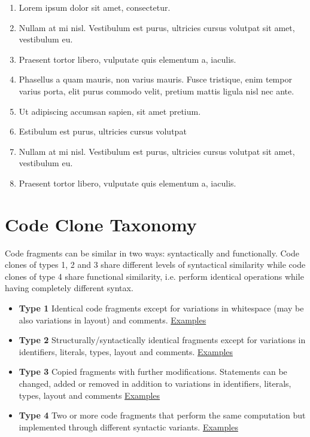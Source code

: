 \documentclass[a0,portrait]{a0poster}
\begin{document}
\begin{multicols}{2}
\begin{enumerate}
\item Lorem ipsum dolor sit amet, consectetur.
\item Nullam at mi nisl. Vestibulum est purus, ultricies cursus volutpat sit amet, vestibulum eu.
\item Praesent tortor libero, vulputate quis elementum a, iaculis.
\item Phasellus a quam mauris, non varius mauris. Fusce tristique, enim tempor varius porta, elit purus commodo velit, pretium mattis ligula nisl nec ante.
\item Ut adipiscing accumsan sapien, sit amet pretium.
\item Estibulum est purus, ultricies cursus volutpat
\item Nullam at mi nisl. Vestibulum est purus, ultricies cursus volutpat sit amet, vestibulum eu.
\item Praesent tortor libero, vulputate quis elementum a, iaculis.
\end{enumerate}


\section*{Code Clone Taxonomy}

Code fragments can be similar in two ways: syntactically and functionally. Code clones of 
types 1, 2 and 3 share different levels of syntactical similarity while code clones of type 4
share functional similarity, i.e. perform identical operations while having completely different
syntax.

\begin{itemize}
\item \textbf{Type 1} Identical code fragments except for variations in whitespace (may be also
variations in layout) and comments. 
\href{https://gist.github.com/omtcyf0/33a00a4f4406f5933526}{Examples}
\item \textbf{Type 2} Structurally/syntactically identical fragments except for variations in identifiers,
literals, types, layout and comments.
\href{https://gist.github.com/omtcyf0/1e6812f98302f374da53}{Examples}
\item \textbf{Type 3} Copied fragments with further modifications. Statements can be changed,
added or removed in addition to variations in identifiers, literals, types, layout
and comments
\href{https://gist.github.com/omtcyf0/dde978ef6696cf47aff8}{Examples}
\item \textbf{Type 4} Two or more code fragments that perform the same computation but
implemented through different syntactic variants.
\href{https://gist.github.com/omtcyf0/2ce1c8962d9a5552cf35}{Examples}
\end{itemize}


\end{multicols}
\end{document}
